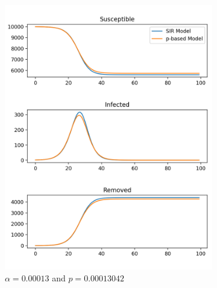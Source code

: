 \documentclass[12pt]{article}
\begin{document}
\begin{figure}[t!]
\centering
\begin{subfigure}[t]{0.3\textwidth}
\includegraphics[width=\textwidth]{sir_comparison_13.png}
\caption{$\alpha = 0.00013$ and $p = 0.00013042$}
\end{subfigure}
~
\begin{subfigure}[t]{0.3\textwidth}

\end{subfigure}
\end{figure}
\end{document}
